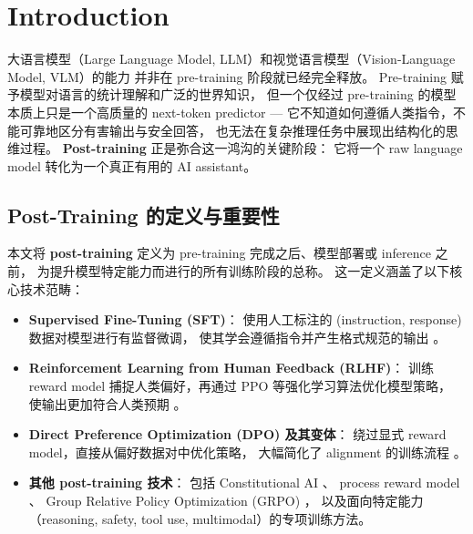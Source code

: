 \section*{Introduction}
\label{sec:t0}

大语言模型（Large Language Model, LLM）和视觉语言模型（Vision-Language Model, VLM）的能力
并非在 pre-training 阶段就已经完全释放。
Pre-training 赋予模型对语言的统计理解和广泛的世界知识，
但一个仅经过 pre-training 的模型本质上只是一个高质量的 next-token predictor ---
它不知道如何遵循人类指令，不能可靠地区分有害输出与安全回答，
也无法在复杂推理任务中展现出结构化的思维过程。
\textbf{Post-training} 正是弥合这一鸿沟的关键阶段：
它将一个 raw language model 转化为一个真正有用的 AI assistant。

\subsection{Post-Training 的定义与重要性}
\label{sec:t0-definition}

本文将 \textbf{post-training} 定义为 pre-training 完成之后、模型部署或 inference 之前，
为提升模型特定能力而进行的所有训练阶段的总称。
这一定义涵盖了以下核心技术范畴：

\begin{itemize}[leftmargin=2em]
  \item \textbf{Supervised Fine-Tuning (SFT)}：
    使用人工标注的 (instruction, response) 数据对模型进行有监督微调，
    使其学会遵循指令并产生格式规范的输出
    \cite{wei2022flan,ouyang2022instructgpt,sanh2022multitask}。

  \item \textbf{Reinforcement Learning from Human Feedback (RLHF)}：
    训练 reward model 捕捉人类偏好，再通过 PPO 等强化学习算法优化模型策略，
    使输出更加符合人类预期
    \cite{christiano2017rlhf,ouyang2022instructgpt,bai2022constitutional}。

  \item \textbf{Direct Preference Optimization (DPO) 及其变体}：
    绕过显式 reward model，直接从偏好数据对中优化策略，
    大幅简化了 alignment 的训练流程
    \cite{rafailov2023dpo,azar2023ipo,ethayarajh2024kto}。

  \item \textbf{其他 post-training 技术}：
    包括 Constitutional AI \cite{bai2022constitutional}、
    process reward model \cite{lightman2023prm}、
    Group Relative Policy Optimization (GRPO) \cite{shao2024grpo}，
    以及面向特定能力（reasoning, safety, tool use, multimodal）的专项训练方法。
\end{itemize}

